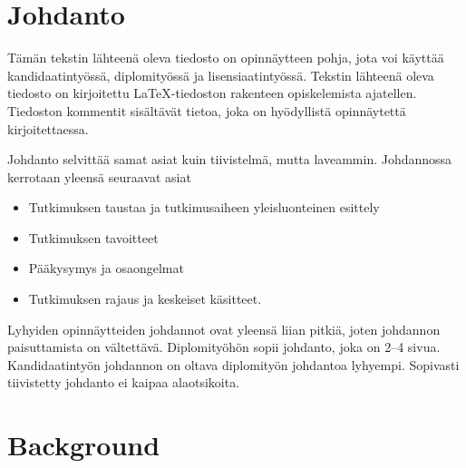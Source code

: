 \documentclass[english,12pt,a4paper,pdftex,sci,utf8]{aaltothesis}
\begin{document}
\section{Johdanto}

\thispagestyle{empty}

T\"am\"an tekstin l\"ahteen\"a oleva tiedosto on opinn\"aytteen
pohja, jota voi k\"aytt\"a\"a kandidaatinty\"oss\"a, diplomity\"oss\"a ja
lisensiaatinty\"oss\"a. Tekstin 
l\"ahteen\"a oleva tiedosto on kirjoitettu  \LaTeX-tiedoston rakenteen
opiskelemista ajatellen. Tiedoston kommentit sis\"alt\"av\"at
tietoa, joka on hy\"odyllist\"a opinn\"aytett\"a kirjoitettaessa. 

Johdanto selvitt\"a\"a samat asiat kuin tiivistelm\"a, mutta
laveammin. Johdannossa kerrotaan yleens\"a seuraavat asiat

\begin{itemize}
\item[--]Tutkimuksen taustaa ja tutkimusaiheen yleisluonteinen esittely
\item[--]Tutkimuksen tavoitteet
\item[--]P\"a\"akysymys ja osaongelmat
\item[--]Tutkimuksen rajaus ja keskeiset k\"asitteet.
\end{itemize}

Lyhyiden opinn\"aytteiden johdannot ovat yleens\"a liian pitki\"a, joten
johdannon paisuttamista on v\"altett\"av\"a. Diplomity\"oh\"on sopii johdanto,
joka on 2--4 sivua. %
Kandidaatinty\"on johdannon on oltava diplomity\"on
johdantoa lyhyempi. Sopivasti tiivistetty johdanto ei kaipaa alaotsikoita.


\clearpage

\section{Background}
\end{document}
